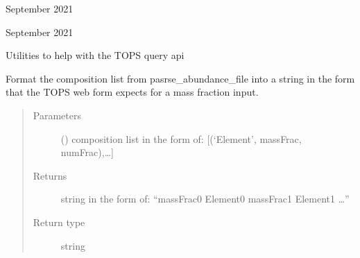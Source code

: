\documentclass[letterpaper,10pt,english]{sphinxmanual}
\begin{document}
\sphinxAtStartPar
{} September 2021

\sphinxAtStartPar
{} September 2021

\sphinxAtStartPar
Utilities to help with the TOPS query api

\begin{fulllineitems}
\label{\detokenize{pyTOPSScrape.api:pyTOPSScrape.api.utils.format_TOPS_string}}
\sphinxAtStartPar
Format the composition list from pasrse\_abundance\_file into a string in the
form that the TOPS web form expects for a mass fraction input.
\begin{quote}\begin{description}
\item[{Parameters}] \leavevmode
\sphinxAtStartPar
{} () \textendash{} composition list in the form of: {[}(‘Element’, massFrac,
numFrac),…{]}

\item[{Returns}] \leavevmode
\sphinxAtStartPar
{} \textendash{} string in the form of: “massFrac0 Element0 massFrac1 Element1 …”

\item[{Return type}] \leavevmode
\sphinxAtStartPar
string

\end{description}\end{quote}

\end{fulllineitems}

\end{document}
